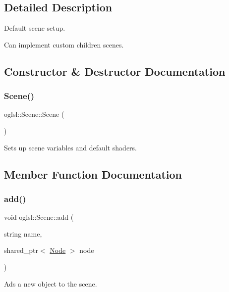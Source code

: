 \subsection{Detailed Description}
Default scene setup. 

Can implement custom children scenes. 

\subsection{Constructor \& Destructor Documentation}
\mbox{\label{classoglsl_1_1_scene_a1d13c881f3b0b7d4d7bd8d5225a50481}} 
\subsubsection{\texorpdfstring{Scene()}{Scene()}}
{\footnotesize\ttfamily oglsl\+::\+Scene\+::\+Scene (\begin{DoxyParamCaption}{ }\end{DoxyParamCaption})}



Sets up scene variables and default shaders. 



\subsection{Member Function Documentation}
\mbox{\label{classoglsl_1_1_scene_a1b1296aab1c81101473a38451c139819}} 
\subsubsection{\texorpdfstring{add()}{add()}}
{\footnotesize\ttfamily void oglsl\+::\+Scene\+::add (\begin{DoxyParamCaption}\item[{string}]{name,  }\item[{shared\+\_\+ptr$<$ \mbox{\hyperlink{classoglsl_1_1_node}{Node}} $>$}]{node }\end{DoxyParamCaption})\hspace{0.3cm}{\ttfamily [inline]}}



Ads a new object to the scene. 

